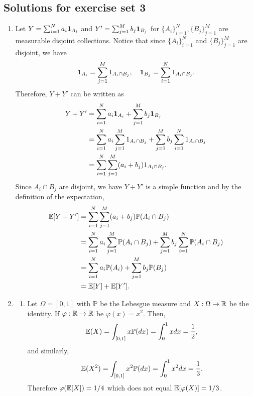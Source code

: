 \documentclass{article}
\begin{document}
\subsection{Solutions for exercise set 3}\label{sec:sol-ex-iii}
\begin{enumerate}
	\item Let $Y=\sum_{i=1}^Na_i\1_{A_i}$ and $Y'=\sum_{j=1}^Mb_j\1_{B_j}$ for $\{A_i\}_{i=1}^N, \{B_j\}_{j=1}^M$ are measurable disjoint collections. Notice that since $\{A_i\}_{i=1}^N$ and $\{B_j\}_{j=1}^M$ are disjoint, we have
	\[\1_{A_i}=\sum_{j=1}^M1_{A_i\cap B_j},\quad \1_{B_j}=\sum_{i=1}^N1_{A_i\cap B_j}.\]
	Therefore, $Y+Y'$ can be written as
	\begin{align*}
	Y+Y'
	&=\sum_{i=1}^Na_i\1_{A_i}+\sum_{j=1}^Mb_j\1_{B_j}\\
	&=\sum_{i=1}^Na_i\sum_{j=1}^M1_{A_i\cap B_j}+\sum_{j=1}^Mb_j\sum_{i=1}^N1_{A_i\cap B_j}\\
	&=\sum_{i=1}^N\sum_{j=1}^M(a_i+b_j)1_{A_i\cap B_j}.
	\end{align*}	
	Since $A_i\cap B_j$ are disjoint, we have $Y+Y'$ is a simple function and by the definition of the expectation,
	\begin{align*}
	\E[Y+Y']
	&=\sum_{i=1}^N\sum_{j=1}^M(a_i+b_j)\P(A_i\cap B_j)\\
	&=\sum_{i=1}^Na_i\sum_{j=1}^M\P(A_i\cap B_j)+\sum_{j=1}^Mb_j\sum_{i=1}^N\P(A_i\cap B_j)\\
	&=\sum_{i=1}^Na_i\P(A_i)+\sum_{j=1}^Mb_j\P(B_j)\\
	&=\E[Y]+\E[Y'].
	\end{align*}
	
	\item 
		\begin{enumerate}
		\item Let $\Omega=[0,1]$ with $\P$ be the Lebesgue measure and $X:\Omega\to\R$ be the identity. If $\varphi:\R\to\R$ be $\varphi(x)=x^2$. Then,
		\begin{align*}
		\E(X)=\int_{[0,1]}x\P(dx)=\int_0^1xdx=\frac{1}{2},
		\end{align*}
		and similarly,
		\begin{align*}
		\E(X^2)=\int_{[0,1]}x^2\P(dx)=\int_0^1x^2dx=\frac{1}{3}.
		\end{align*}
		Therefore $\varphi(\E [X])=1/4$ which does not equal $\E[\varphi(X)]=1/3$.
		

\end{enumerate}
\end{enumerate}
\end{document}
